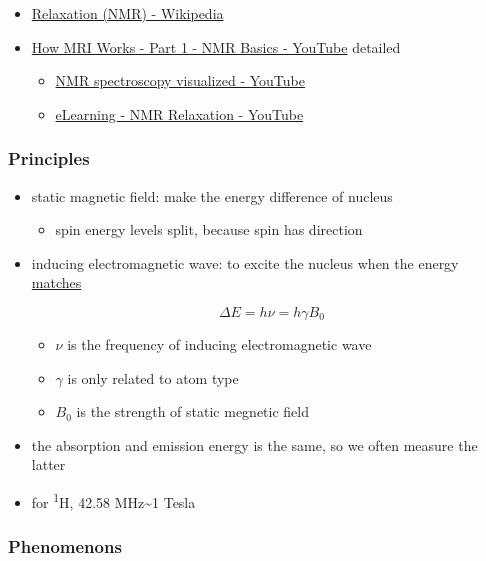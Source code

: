 \documentclass[]{article}
\begin{document}
\begin{itemize}
\item
  \href{https://en.wikipedia.org/wiki/Relaxation_(NMR)}{Relaxation (NMR)
  - Wikipedia}
\item
  \href{https://www.youtube.com/watch?v=TQegSF4ZiIQ}{How MRI Works -
  Part 1 - NMR Basics - YouTube} detailed

  \begin{itemize}
  \item
    \href{https://www.youtube.com/watch?v=RZLew6Ff-JE}{NMR spectroscopy
    visualized - YouTube}
  \item
    \href{https://www.youtube.com/watch?v=DQ5kO-jPQyA}{eLearning - NMR
    Relaxation - YouTube}
  \end{itemize}
\end{itemize}

\hypertarget{principles-1}{%
\subsubsection{Principles}\label{principles-1}}

\begin{itemize}
\item
  static magnetic field: make the energy difference of nucleus

  \begin{itemize}
  \item
    spin energy levels split, because spin has direction
  \end{itemize}
\item
  inducing electromagnetic wave: to excite the nucleus when the energy
  \underline{matches}

  \[\Delta E=h\nu=h\gamma B_0\]

  \begin{itemize}
  \item
    \(\nu\) is the frequency of inducing electromagnetic wave
  \item
    \(\gamma\) is only related to atom type
  \item
    \(B_0\) is the strength of static megnetic field
  \end{itemize}
\item
  the absorption and emission energy is the same, so we often measure
  the latter
\item
  for \textsuperscript{1}H, 42.58 MHz\textasciitilde{}1 Tesla
\end{itemize}

\hypertarget{phenomenons}{%
\subsubsection{Phenomenons}\label{phenomenons}}
\end{document}
